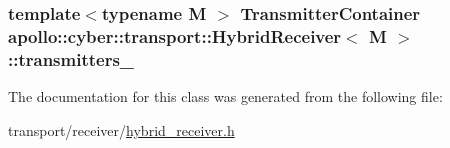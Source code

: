 \hypertarget{classapollo_1_1cyber_1_1transport_1_1HybridReceiver_a0763ec6d7247a952123cdc5a0c2fa7f2}{
\subsubsection[{transmitters\-\_\-}]{\setlength{\rightskip}{0pt plus 5cm}template$<$typename M $>$ {\bf Transmitter\-Container} {\bf apollo\-::cyber\-::transport\-::\-Hybrid\-Receiver}$<$ M $>$\-::transmitters\-\_\-\hspace{0.3cm}{\ttfamily [private]}}}\label{classapollo_1_1cyber_1_1transport_1_1HybridReceiver_a0763ec6d7247a952123cdc5a0c2fa7f2}


The documentation for this class was generated from the following file\-:\begin{DoxyCompactItemize}
\item 
transport/receiver/\hyperlink{hybrid__receiver_8h}{hybrid\-\_\-receiver.\-h}\end{DoxyCompactItemize}
